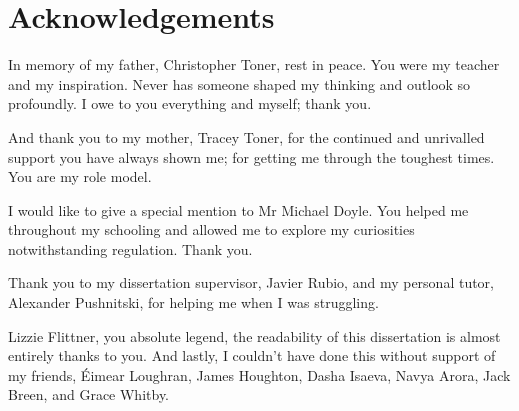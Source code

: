 \section*{Acknowledgements}

In memory of my father, Christopher Toner, rest in peace. You were my teacher and my inspiration. Never has someone shaped my thinking and outlook so profoundly. I owe to you everything and myself; thank you.

And thank you to my mother, Tracey Toner, for the continued and unrivalled support you have always shown me; for getting me through the toughest times. You are my role model.

I would like to give a special mention to Mr Michael Doyle. You helped me throughout my schooling and allowed me to explore my curiosities notwithstanding regulation. Thank you.

Thank you to my dissertation supervisor, Javier Rubio, and my personal tutor, Alexander Pushnitski, for helping me when I was struggling. 

Lizzie Flittner, you absolute legend, the readability of this dissertation is almost entirely thanks to you. And lastly, I couldn't have done this without support of my friends, \'Eimear Loughran, James Houghton, Dasha Isaeva, Navya Arora, Jack Breen, and Grace Whitby.